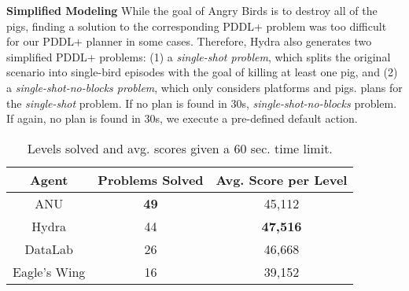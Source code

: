 \documentclass[letterpaper]{article}
\begin{document}
\noindent\textbf{Simplified Modeling} While the goal of Angry Birds is to destroy all of the pigs, finding a solution to the corresponding PDDL+ problem was too difficult for our PDDL+ planner in some cases.
Therefore, Hydra also generates two simplified PDDL+ problems:
(1) a \textit{single-shot problem}, which splits the original scenario into single-bird episodes with the goal of killing at least one pig, and (2) a \textit{single-shot-no-blocks problem}, which only considers platforms and pigs.  plans for the \textit{single-shot} problem.
If no plan is found in 30s,  \textit{single-shot-no-blocks} problem.
If again, no plan is found in 30s, we execute a pre-defined default action.

































\begin{table}[tb!]
\centering
\begin{adjustbox}{width=0.82\columnwidth}
\begin{tabular}{|c|c|c|}
\hline
\textbf{Agent} & \textbf{Problems Solved} & \textbf{Avg. Score per Level} \\ \hline
ANU    & \textbf{49}              & 45,112                      \\ \hline
Hydra          & 44                       & \textbf{47,516}             \\ \hline
DataLab        & 26                       & 46,668                      \\ \hline
Eagle's  Wing  & 16                       & 39,152                      \\ \hline
\end{tabular}
\end{adjustbox}
\caption{Levels solved and avg. scores given a 60 sec. time limit.}
\label{tab:results}
\end{table}
\end{document}
